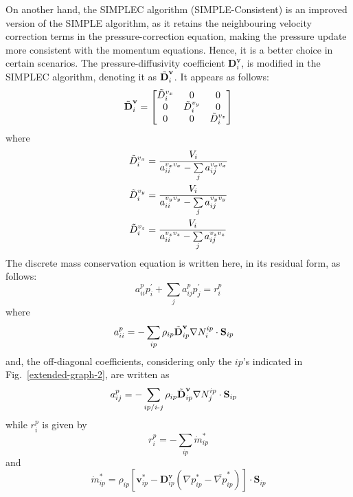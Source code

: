 \documentclass[12pt]{extarticle}
\newcommand{\<}{\langle}
\renewcommand{\>}{\rangle}
\theoremstyle{definition}
\begin{document}
On another hand, the SIMPLEC algorithm (SIMPLE-Consistent) is an improved version of the SIMPLE algorithm, as it retains the neighbouring velocity correction terms in the pressure-correction equation, making the pressure update more consistent with the momentum equations. Hence, it is a better choice in certain scenarios. The pressure-diffusivity coefficient \(\textbf{D}^{\textbf{v}}_{i}\), is modified in the SIMPLEC algorithm, denoting it as $\Tilde{\textbf{D}}^{\textbf{v}}_i$. It appears as follows:
\begin{equation}
\Tilde{\textbf{D}}^{\textbf{v}}_{i}=
\begin{bmatrix}
\Tilde{D}^{v_x}_i & 0 & 0\\
0 & \Tilde{D}^{v_y}_i & 0 \\
0 & 0 & \Tilde{D}^{v_z}_i\\
\end{bmatrix}
\end{equation}
where
\begin{align}
    \Tilde{D}^{v_x}_i &= \frac{V_i}{a_{ii}^{v_xv_x} - \sum\limits_{j} a^{v_xv_x}_{ij}} \\
    \Tilde{D}^{v_y}_i &= \frac{V_i}{a_{ii}^{v_yv_y} - \sum\limits_{j} a^{v_yv_y}_{ij}} \\
    \Tilde{D}^{v_z}_i &= \frac{V_i}{a_{ii}^{v_zv_z} - \sum\limits_{j} a^{v_zv_z}_{ij}} \\
\end{align}
The discrete mass conservation equation is written here, in its residual form, as follows:
\begin{equation}
    a_{ii}^{p} p_i^\prime + \sum_{j} a_{ij}^{p} p_j^\prime = r_i^p
    \label{eq:simplec_mass}
\end{equation}
where
\begin{align}
    a_{ii}^{p} &= -\sum_{ip}\rho_{ip}\Tilde{\textbf{D}}^{\textbf{v}}_{ip} \nabla N_i^{ip} \cdot \textbf{S}_{ip}
\end{align}
and, the off-diagonal coefficients, considering only the $ip$'s indicated in Fig.~\ref{extended-graph-2}, are written as
\begin{align}
    a_{ij}^{p} &= -\sum_{ip/i\text{-}j}\rho_{ip} \Tilde{\textbf{D}}^{\textbf{v}}_{ip} \nabla N_j^{ip} \cdot \textbf{S}_{ip}
\end{align}
while $r^p_i$ is given by
\begin{equation}
    r_i^{p} = -\sum_{ip} \dot{m}^{*}_{ip}
\end{equation}
and
\begin{equation}
    \dot{m}^{*}_{ip} = \rho_{ip} \left[\textbf{v}^{*}_{ip} - \textbf{D}^{\textbf{v}}_{ip} \left ( \nabla p_{ip}^{*} - \overline{\nabla p}_{ip}^{*} \right)\right] \cdot \textbf{S}_{ip}
\end{equation}
\end{document}
